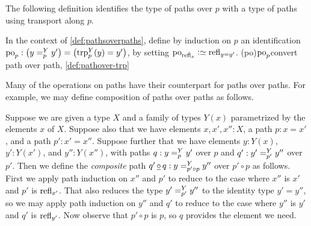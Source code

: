 \begin{definition}
{}%
\end{definition}

The following definition identifies the type of paths over $p$ with a type
of paths using transport along $p$.

\begin{definition}\label{def:pathover-trp}
In the context of \cref{def:pathsoverpaths}, define by induction on $p$ an
identification
$\po_p: \left(\pathover y Y p {y'}\right) = \left( \trp[Y]{p}(y)=y'\right)$,
by setting $\po_{\refl{x}} \defeq \refl{y=y'}$.%
\glossary(po){$\protect\po_p$}{convert path over path, \cref{def:pathover-trp}}
\end{definition}

Many of the operations on paths have their counterpart for paths over paths.
For example, we may define composition of paths over paths as follows.

\begin{definition}\label{def:pathovercomposition}
  Suppose we are given a type $X$ and a family of types $Y(x)$ parametrized by the elements $x$ of $X$.
  Suppose also that we have elements $x, x', x'' : X$, a path $p : x = x'$, and a path $p' : x' = x''$.
  Suppose further that we have elements $y : Y(x)$, $y' : Y(x')$, and $y'' : Y(x'')$, with paths $q : \pathover y Y p {y'}$ over $p$
  and $q' : \pathover {y'} Y {p'} {y''}$ over $p'$.
  Then we define the \emph{composite} path $q' \pathovercomp q : \pathover y Y {p' \circ p} {y''}$ over $p' \circ p$ as follows.
  First we apply path induction on $x''$ and $p'$ to reduce to the case where $x''$ is $x'$ and $p'$ is $\mathrm{refl}_{x'}$.
  That also reduces the type $\pathover {y'} Y {p'} {y''}$ to the identity type $y' = y''$, so we may apply path induction on $y''$ and $q'$ to reduce
  to the case where $y''$ is $y'$ and $q'$ is $\mathrm{refl}_{y'}$.
  Now observe that $p' \circ p$ is $p$, so $q$ provides the element we need.
\end{definition}

